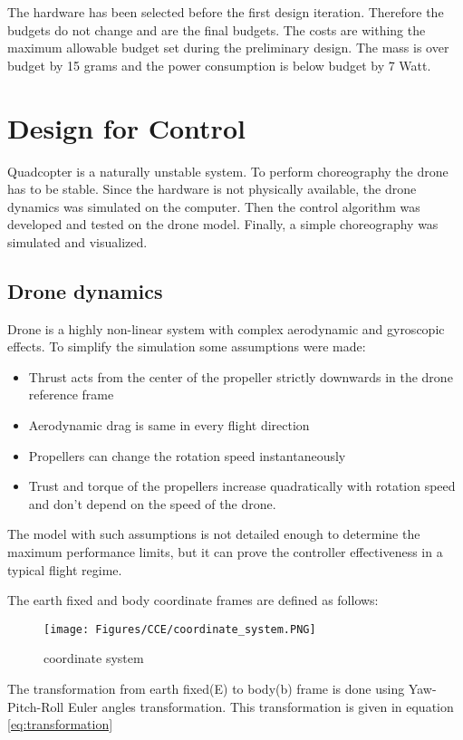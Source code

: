 The hardware has been selected before the first design iteration. Therefore the budgets do not change and are the final budgets. The costs are withing the maximum allowable budget set during the preliminary design. The mass is over budget by 15 grams and the power consumption is below budget by 7 Watt.





\section{Design for Control}
\label{sec:cce_control}
Quadcopter is a naturally unstable system. To perform choreography the drone has to be stable. Since the hardware is not physically available, the drone dynamics was simulated on the computer. Then the control algorithm was developed and tested on the drone model. Finally, a simple choreography was simulated and visualized. 

\subsection{Drone dynamics} \label{CCE_drone_dynamics}
Drone is a highly non-linear system with complex aerodynamic and gyroscopic effects. To simplify the simulation some assumptions were made: 
\begin{itemize}[noitemsep,nolistsep]
    \item Thrust acts from the center of the propeller strictly downwards in the drone reference frame
    \item Aerodynamic drag is same in every flight direction
    \item Propellers can change the rotation speed instantaneously
    \item Trust and torque of the propellers increase quadratically with rotation speed and don't depend on the speed of the drone. 
\end{itemize}
The model with such assumptions is not detailed enough to determine the maximum performance limits, but it can prove the controller effectiveness in a typical flight regime. 

The earth fixed and body coordinate frames are defined as follows: 
\begin{figure}[H]
    \centering
    \texttt{[image: Figures/CCE/coordinate\_system.PNG]}
    \caption{coordinate system}
    \label{fig:coordinate_system}
\end{figure}
The transformation from earth fixed(E) to body(b) frame is done using Yaw-Pitch-Roll Euler angles transformation. This transformation is given in equation \ref{eq:transformation}

